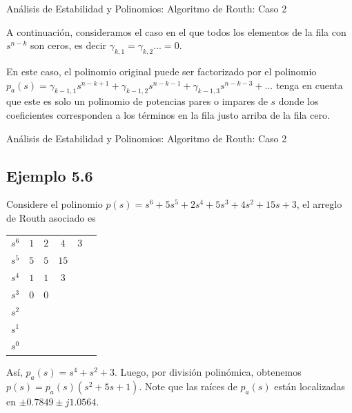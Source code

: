 \documentclass{beamer}
\begin{document}
\begin{frame}{Análisis de Estabilidad y Polinomios: Algoritmo de Routh: Caso 2}
\begin{justify}
A continuación, consideramos el caso en el que todos los elementos de la fila con $s^{n-k}$ son ceros, es decir $\gamma_{k,1} = \gamma_{k,2} ... = 0$.

En este caso, el polinomio original puede ser factorizado por el polinomio $p_a(s)=\gamma_{k-1,1}s^{n-k+1} + \gamma_{k-1,2}s^{n-k-1} + \gamma_{k-1,3}s^{n-k-3} + ... $ tenga en cuenta que este es solo un polinomio de potencias pares o impares de $s$ donde los coeficientes corresponden a los términos en la fila justo arriba de la fila cero. 

\end{justify}
\end{frame}



\begin{frame}{Análisis de Estabilidad y Polinomios: Algoritmo de Routh: Caso 2}
\begin{justify}

\subsection*{Ejemplo 5.6}
Considere el polinomio $p(s) = s^6 + 5s^5 + 2s^4 + 5s^3 + 4s^2 + 15s + 3$, el arreglo de Routh asociado es

{\footnotesize
\begin{center}
\begin{tabular}{c|ccccc}
$s^6$ & $1$ & $2$ & $4$ & $3$ \\ 
$s^5$ & $5$ & $5$ & $15$ &  \\ 
$s^4$ & $1$ & $1$ & $3$ &  \\ 
$s^3$ & $0$ & $0$ &  &  \\ 
$s^2$ &  &  &  &  \\ 
$s^1$ &  &  &  &  \\ 
$s^0$ &  &  &  &  \\ 
\end{tabular}
\end{center}
}

Así, $p_a(s) = s^4 + s^2 + 3$. Luego, por división polinómica, obtenemos $p(s) = p_a(s)(s^2 + 5s + 1)$. Note que las raíces de $p_a(s)$ están localizadas en $\pm 0.7849 \pm j1.0564$.

\end{justify}
\end{frame}
\end{document}

